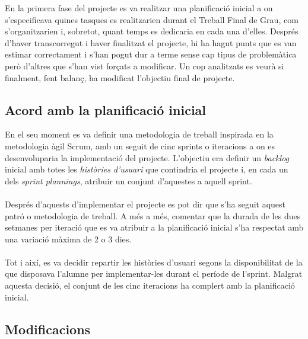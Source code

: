 En la primera fase del projecte es va realitzar una planificació inicial a on s'especificava quines tasques es realitzarien durant el Treball Final de Grau, com s'organitzarien i, sobretot, quant temps es dedicaria en cada una d'elles. Després d'haver transcorregut i haver finalitzat el projecte, hi ha hagut punts que es van estimar correctament i s'han pogut dur a terme sense cap tipus de problemàtica però d'altres que s'han vist forçats a modificar. Un cop analitzats es veurà si finalment, fent balanç, ha modificat l'objectiu final de projecte.

\subsection{Acord amb la planificació inicial}

En el seu moment es va definir una metodologia de treball inspirada en la metodologia àgil Scrum, amb un seguit de cinc sprints o iteracions a on es desenvoluparia la implementació del projecte. L'objectiu era definir un \textit{backlog} inicial amb totes les \textit{històries d'usuari} que contindria el projecte i, en cada un dels \textit{sprint plannings}, atribuir un conjunt d'aquestes a aquell sprint.
\\\\
Després d'aquests d'implementar el projecte es pot dir que s'ha seguit aquest patró o metodologia de treball. A més a més, comentar que la durada de les dues setmanes per iteració que es va atribuir a la planificació inicial s'ha respectat amb una variació màxima de 2 o 3 dies.
\\\\
Tot i així, es va decidir repartir les històries d'usuari segons la disponibilitat de la que disposava l'alumne per implementar-les durant el període de l'sprint. Malgrat aquesta decisió, el conjunt de les cinc iteracions ha complert amb la planificació inicial.


\subsection{Modificacions}

